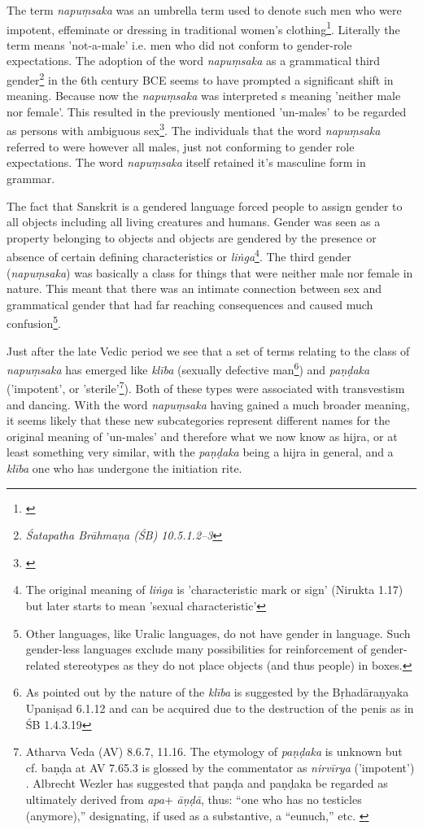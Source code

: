 The term {\em napuṃsaka} was an umbrella term used to denote such men who were impotent, effeminate or dressing in traditional women's clothing\footnote{\cite{zwilling}}. Literally the term means 'not-a-male' i.e. men who did not conform to gender-role expectations. The adoption of the word {\em napuṃsaka} as a grammatical third gender\footnote{{\em Śatapatha Brāhmaṇa (ŚB) 10.5.1.2–3}} in the 6th century BCE seems to have prompted a significant shift in meaning. Because now the {\em napuṃsaka} was interpreted s meaning 'neither male nor female'. This resulted in the previously mentioned 'un-males' to be regarded as persons with ambiguous sex\footnote{\cite{zwilling2000}}. The individuals that the word {\em napuṃsaka} referred to were however all males, just not conforming to gender role expectations. The word {\em napuṃsaka} itself retained it's masculine form in grammar.

The fact that Sanskrit is a gendered language forced people to assign gender to all objects including all living creatures and humans. Gender was seen as a property belonging to objects and objects are gendered by the presence or absence of certain defining characteristics or {\em liṅga}\footnote{The original meaning of {\em liṅga} is 'characteristic mark or sign' (Nirukta 1.17) but later starts to mean 'sexual characteristic'}. The third gender ({\em napuṃsaka}) was basically a class for things that were neither male nor female in nature. This meant that there was an intimate connection between sex and grammatical gender that had far reaching consequences and caused much confusion\footnote{Other languages, like Uralic languages, do not have gender in language. Such gender-less languages exclude many possibilities for reinforcement of gender-related stereotypes as they do not place objects (and thus people) in boxes.}. 

Just after the late Vedic period we see that a set of terms relating to the class of {\em napuṃsaka} has emerged like {\em klība} (sexually defective man\footnote{As pointed out by \cite{zwilling} the nature of the {\em klība} is suggested by the Bṛhadāraṇyaka Upaniṣad 6.1.12 and can be acquired due to the destruction of the penis as in ŚB 1.4.3.19}) and {\em paṇḍaka} ('impotent', or 'sterile'\footnote{Atharva Veda (AV) 8.6.7, 11.16. The etymology of {\em paṇḍaka} is unknown but cf. baṇḍa at AV 7.65.3 is glossed by the commentator as {\em nirvīrya} ('impotent') \cite{zwilling}. Albrecht Wezler has suggested that paṇḍa and paṇḍaka be regarded as ultimately derived from {\em *apa}+ {\em āṇḍā}, thus: “one who has no testicles (anymore),” designating, if used as a substantive, a “eunuch,” etc. \cite{wezler}}). Both of these types were associated with transvestism and dancing. With the word {\em napuṃsaka} having gained a much broader meaning, it seems likely that these new subcategories represent different names for the original meaning of 'un-males' and therefore what we now know as hijra, or at least something very similar, with the {\em paṇḍaka} being a hijra in general, and a {\em klība} one who has undergone the initiation rite.


